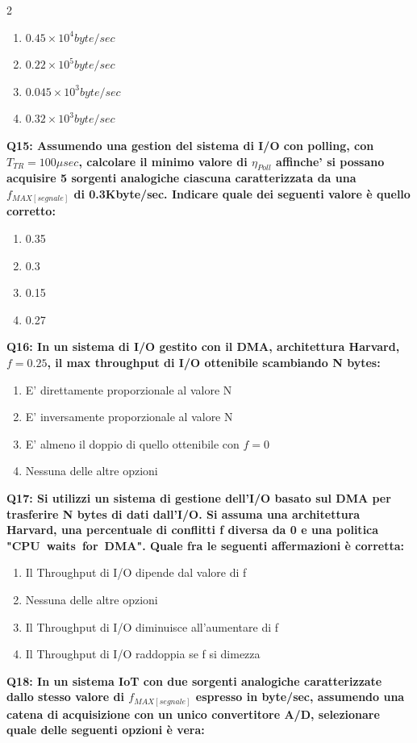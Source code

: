 \documentclass[10pt]{article}
\begin{document}
\begin{multicols}{2}
\begin{enumerate}[label=\arabic*.]
\item $0.45\times10^4 byte/sec$
\item $0.22\times10^5 byte/sec$
\item $0.045\times10^3 byte/sec$
\item $0.32\times10^3 byte/sec$
\end{enumerate}
\textbf{Q15: Assumendo una gestion del sistema di I/O con polling, con $T_{TR}=100\mu sec$, calcolare il minimo valore di $\eta_{Poll}$ affinche' si possano acquisire 5 sorgenti analogiche ciascuna caratterizzata da una $f_{MAX[segnale]}$ di 0.3Kbyte/sec.  Indicare quale dei seguenti valore è quello corretto:}

\begin{enumerate}[label=\arabic*.]
\item 0.35
\item 0.3
\item 0.15
\item 0.27
\end{enumerate}
\textbf{Q16: In un sistema di I/O gestito con il DMA, architettura Harvard, $f=0.25$, il max throughput di I/O ottenibile scambiando N bytes:}

\begin{enumerate}[label=\arabic*.]
\item E' direttamente proporzionale al valore N
\item E' inversamente proporzionale al valore N
\item E' almeno il doppio di quello ottenibile con $f=0$
\item Nessuna delle altre opzioni
\end{enumerate}
\textbf{Q17: Si utilizzi un sistema di gestione dell’I/O basato sul DMA per trasferire N bytes di dati dall’I/O. Si assuma una architettura Harvard, una percentuale di conflitti f diversa da 0 e una politica "CPU waits for DMA". Quale fra le seguenti affermazioni è corretta:}

\begin{enumerate}[label=\arabic*.]
\item Il Throughput di I/O dipende dal valore di f
\item Nessuna delle altre opzioni
\item Il Throughput di I/O diminuisce all’aumentare di f
\item Il Throughput di I/O raddoppia se f si dimezza
\end{enumerate}
\textbf{Q18: In un sistema IoT con due sorgenti analogiche caratterizzate dallo stesso valore di $f_{MAX[segnale]}$ espresso in byte/sec, assumendo una catena di acquisizione con un unico convertitore A/D, selezionare quale delle seguenti opzioni è vera:}


\end{multicols}
\end{document}
